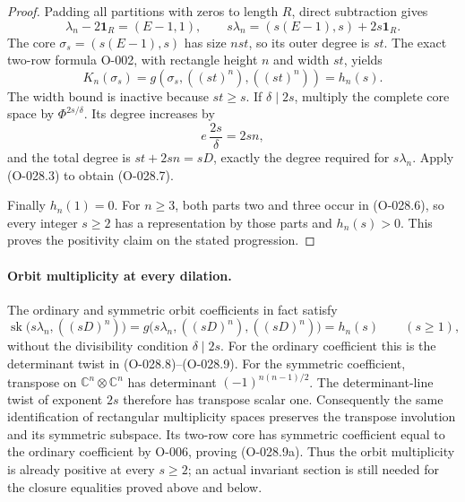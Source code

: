 \begin{proof}
Padding all partitions with zeros to length \(R\), direct
subtraction gives
\[
        \lambda_n-2\mathbf1_R=(E-1,1),\qquad
        s\lambda_n=(s(E-1),s)+2s\mathbf1_R.
                                                               \tag{O-028.8}
\]
The core \(\sigma_s=(s(E-1),s)\) has size \(nst\), so
its outer degree is \(st\). The exact two-row formula
O-002, with rectangle height \(n\) and width \(st\), yields
\[
                    K_n(\sigma_s)
                   =g(\sigma_s,((st)^n),((st)^n))
                   =h_n(s).
                                                               \tag{O-028.9}
\]
The width bound is inactive because \(st\geq s\).
If \(\delta\mid2s\), multiply the complete core space by
\(\Phi^{2s/\delta}\). Its degree increases by
\[
                     e\,\frac{2s}{\delta}=2sn,
\]
and the total degree is \(st+2sn=sD\), exactly the degree
required for \(s\lambda_n\). Apply (O-028.3) to obtain
(O-028.7).

Finally \(h_n(1)=0\). For \(n\geq3\), both parts two and
three occur in (O-028.6), so every integer \(s\geq2\)
has a representation by those parts and \(h_n(s)>0\).
This proves the positivity claim on the stated progression.
\end{proof}

\paragraph{Orbit multiplicity at every dilation.}
The ordinary and symmetric orbit coefficients in fact satisfy
\[
 \operatorname{sk}\bigl(s\lambda_n,((sD)^n)\bigr)
   =g\bigl(s\lambda_n,((sD)^n),((sD)^n)\bigr)
   =h_n(s)\qquad(s\geq1),
                                                               \tag{O-028.9a}
\]
without the divisibility condition \(\delta\mid2s\).
For the ordinary coefficient this is the determinant twist
in (O-028.8)--(O-028.9).
For the symmetric coefficient, transpose on
\(\mathbb C^n\otimes\mathbb C^n\) has determinant
\((-1)^{n(n-1)/2}\).
The determinant-line twist of exponent \(2s\) therefore
has transpose scalar one.
Consequently the same identification of rectangular
multiplicity spaces preserves the transpose involution
and its symmetric subspace.
Its two-row core has symmetric coefficient equal to the
ordinary coefficient by O-006, proving (O-028.9a).
Thus the orbit multiplicity is already positive at every
\(s\geq2\); an actual invariant section is still needed
for the closure equalities proved above and below.

